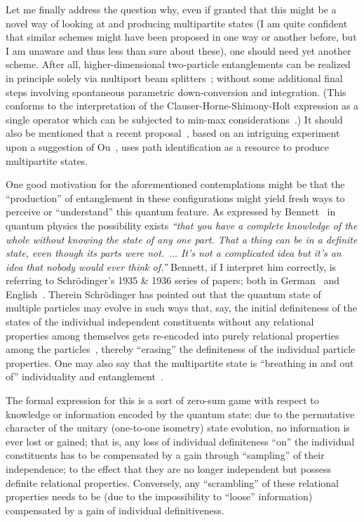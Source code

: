 \documentclass{ws-book9x6}
\begin{document}
Let me finally address the question why, even if granted that this might be a novel way of looking at and producing multipartite states
(I am quite confident that similar schemes might have been proposed in one way or another before, but I am unaware and thus less than sure about these),
one should need yet another scheme.
After all, higher-dimensional two-particle entanglements can be realized in principle solely via multiport beam splitters~\cite{zukowski-97};
without some additional final steps involving
spontaneous parametric down-conversion and integration.
(This conforms to the interpretation of the Clauser-Horne-Shimony-Holt expression as a single operator which can be
subjected to min-max considerations~\cite{filipp-svo-04-qpoly-prl}.)
It should also be mentioned that a recent proposal~\cite{PhysRevLett.118.080401}, based on an intriguing experiment~\cite{zou-wang-mandel:91a,zou-wang-mandel:91b}
upon a suggestion of Ou~\cite{ou-2007}, uses path identification as a resource to produce multipartite states.

One good motivation for the aforementioned contemplations might be that
the ``production'' of entanglement in these configurations
might yield fresh ways to perceive or ``understand'' this quantum feature.
As expressed by Bennett~\cite{Bennett-IBM-03.05.2016}
in quantum physics the possibility exists {\em ``that you have a complete knowledge
of the whole without knowing the state of any one part. That a thing can be in a definite
state, even though its parts were not.~$\ldots$
It's not a complicated idea but
it's an idea that nobody would ever think of.''}
Bennett, if I interpret him correctly, is referring to
Schr\"odinger's 1935 \& 1936 series of papers; both in German~\cite{schrodinger,schrodinger-en-10.2307/986572}
and English~\cite{CambridgeJournals:1737068,CambridgeJournals:2027212}.
Therein Schr\"odinger has pointed out that the quantum state of multiple particles may evolve in such ways that,
say,
the initial definiteness of the states of the individual independent constituents without any relational properties among themselves
gets re-encoded into purely relational properties among the particles~\cite{wootters-1990-localaccOQStates,mermin:753,Zeilinger-97,zeil-99},
thereby ``erasing'' the definiteness of the individual particle properties.
One may also say that the multipartite state is ``breathing in and out of'' individuality and entanglement~\cite{svozil-2016-pu-book}.

The formal expression for this is a sort of zero-sum game with respect to knowledge or information encoded by the quantum state:
due to the permutative character of the unitary (one-to-one isometry) state evolution, no information is ever lost or gained;
that is, any loss of individual definiteness ``on'' the individual constituents has to be compensated by a gain through
``sampling'' of their independence; to the effect that they are no longer independent but possess definite relational properties.
Conversely, any ``scrambling'' of these relational properties needs to be (due to the impossibility to ``loose'' information)
compensated by a gain of individual definitiveness.
\end{document}

